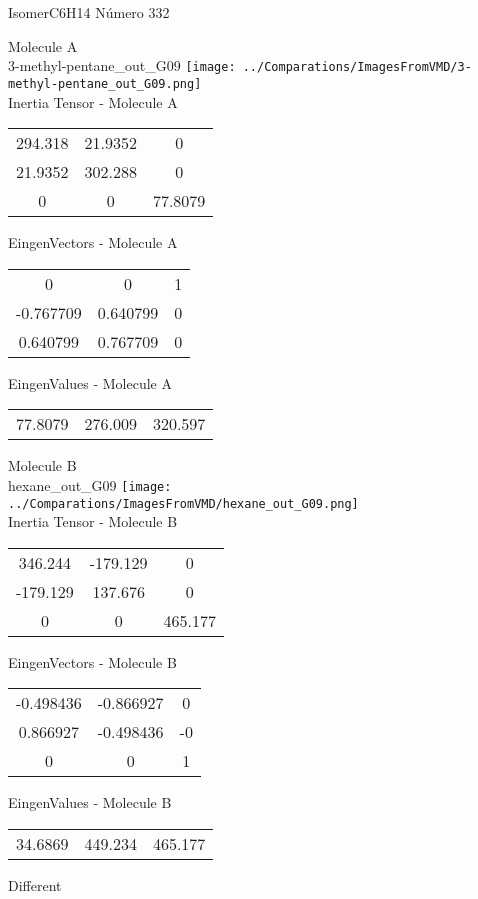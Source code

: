 \vtab[-2cm]
\begin{center}
{\large IsomerC6H14 \tab Número 332}
\end{center}
\begin{multicols}{2}
\begin{center}

Molecule A \\ 
3-methyl-pentane\_out\_G09
\texttt{[image: ../Comparations/ImagesFromVMD/3-methyl-pentane\_out\_G09.png]}
\\
Inertia Tensor - Molecule A \\
\vtab

\begin{tabular}{|c c c|}
294.318	 & 	21.9352	 & 	0	 \\
21.9352	 & 	302.288	 & 	0	 \\
0	 & 	0	 & 	77.8079
\end{tabular}

\vtab
 EingenVectors - Molecule A     \\
\vtab
\begin{tabular}{|c c c|}
0	 & 	0	 & 	1	 \\
-0.767709	 & 	0.640799	 & 	0	 \\
0.640799	 & 	0.767709	 & 	0
\end{tabular}

\vtab
 EingenValues - Molecule A     \\
\vtab
\begin{tabular}{|c c c|}
77.8079	 & 	276.009	 & 	320.597	 \\
\end{tabular}
\columnbreak

Molecule B \\ 
hexane\_out\_G09
\texttt{[image: ../Comparations/ImagesFromVMD/hexane\_out\_G09.png]}
\\
Inertia Tensor - Molecule B \\
\vtab

\begin{tabular}{|c c c|}
346.244	 & 	-179.129	 & 	0	 \\
-179.129	 & 	137.676	 & 	0	 \\
0	 & 	0	 & 	465.177
\end{tabular}

\vtab
 EingenVectors - Molecule B     \\
\vtab
\begin{tabular}{|c c c|}
-0.498436	 & 	-0.866927	 & 	0	 \\
0.866927	 & 	-0.498436	 & 	-0	 \\
0	 & 	0	 & 	1
\end{tabular}

\vtab
 EingenValues - Molecule B     \\
\vtab
\begin{tabular}{|c c c|}
34.6869	 & 	449.234	 & 	465.177	 \\
\end{tabular}

\end{center}
\end{multicols}
\begin{center}
\vtab
\vtab
\textcolor{NavyBlue}{\Large Different}
\end{center}

